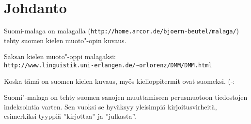 \section{Johdanto}

Suomi-malaga on malagalla (\verb=http://home.arcor.de/bjoern-beutel/malaga/=)
tehty suomen kielen muoto"-opin kuvaus.

Saksan kielen muoto"-oppi malagaksi: \\
\verb=http://www.linguistik.uni-erlangen.de/~orlorenz/DMM/DMM.html=

Koska tämä on suomen kielen kuvaus, myös kielioppitermit ovat
suomeksi. (-:

Suomi"-malaga on tehty suomen sanojen muuttamiseen perusmuotoon tiedostojen 
indeksointia varten. Sen vuoksi se hyväksyy yleisimpiä kirjoitusvirheitä,
esimerkiksi tyyppiä ''kirjottaa'' ja ''julkasta''.
